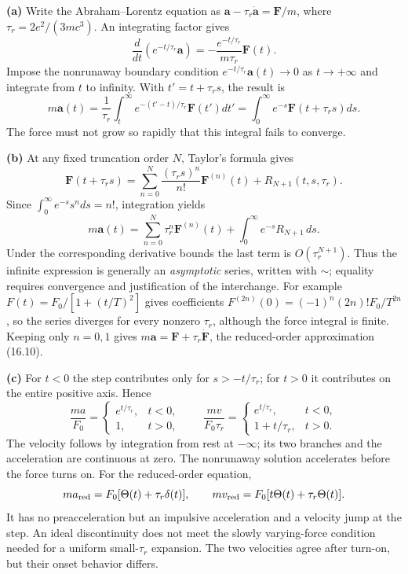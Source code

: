 \textbf{(a)} Write the Abraham--Lorentz equation as
$\mathbf a-\tau_r\dot{\mathbf a}=\mathbf F/m$,
where $\tau_r=2e^2/(3mc^3)$.
An integrating factor gives
\[
\frac d{dt}(e^{-t/\tau_r}\mathbf a)
=-\frac{e^{-t/\tau_r}}{m\tau_r}\mathbf F(t).
\]
Impose the nonrunaway boundary condition
$e^{-t/\tau_r}\mathbf a(t)\to0$ as $t\to+\infty$ and integrate from
$t$ to infinity. With $t'=t+\tau_rs$, the result is
\[
\boxed{m\mathbf a(t)=\frac1{\tau_r}\int_t^\infty
 e^{-(t'-t)/\tau_r}\mathbf F(t')dt'
=\int_0^\infty e^{-s}\mathbf F(t+\tau_rs)ds.}
\]
The force must not grow so rapidly that this integral fails to converge.

\textbf{(b)} At any fixed truncation order $N$, Taylor's formula gives
\[
\mathbf F(t+\tau_rs)=\sum_{n=0}^N
\frac{(\tau_rs)^n}{n!}\mathbf F^{(n)}(t)
+R_{N+1}(t,s,\tau_r).
\]
Since $\int_0^\infty e^{-s}s^n ds=n!$, integration yields
\[
m\mathbf a(t)=\sum_{n=0}^N\tau_r^n\mathbf F^{(n)}(t)
+\int_0^\infty e^{-s}R_{N+1}\,ds.
\]
Under the corresponding derivative bounds the last term is
$O(\tau_r^{N+1})$. Thus the infinite expression is generally an
\emph{asymptotic} series, written with $\sim$; equality requires
convergence and justification of the interchange.
For example $F(t)=F_0/[1+(t/T)^2]$ gives coefficients
$F^{(2n)}(0)=(-1)^n(2n)!F_0/T^{2n}$, so the series diverges for every
nonzero $\tau_r$, although the force integral is finite.
Keeping only $n=0,1$ gives $m\mathbf a=\mathbf F+\tau_r\dot{\mathbf F}$,
the reduced-order approximation (16.10).

\textbf{(c)} For $t<0$ the step contributes only for
$s>-t/\tau_r$; for $t>0$ it contributes on the entire positive axis.
Hence
\[
\boxed{\frac{ma}{F_0}=\begin{cases}e^{t/\tau_r},&t<0,\\1,&t>0,\end{cases}
\qquad
\frac{mv}{F_0\tau_r}=\begin{cases}e^{t/\tau_r},&t<0,\\1+t/\tau_r,&t>0.
\end{cases}}
\]
The velocity follows by integration from rest at $-\infty$; its two
branches and the acceleration are continuous at zero.
The nonrunaway solution accelerates before the force turns on.
For the reduced-order equation,
\[
ma_{\rm red}=F_0[\Theta(t)+\tau_r\delta(t)],\qquad
mv_{\rm red}=F_0[t\Theta(t)+\tau_r\Theta(t)].
\]
It has no preacceleration but an impulsive acceleration and a velocity
jump at the step. An ideal discontinuity does not meet the slowly
varying-force condition needed for a uniform small-$\tau_r$ expansion.
The two velocities agree after turn-on, but their onset behavior differs.
\begin{center}\end{center}

